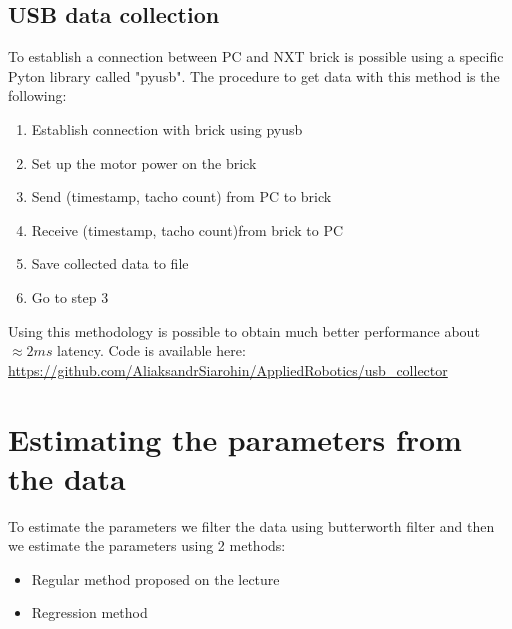 \documentclass[a4paper,12pt,oneside]{article}
\begin{document}
\subsection{USB data collection}
To establish a connection between PC and NXT brick is possible using a specific Pyton library called "pyusb".
The procedure to get data with this method is the following:
\begin{enumerate}
\item Establish connection with brick using pyusb
\item Set up the motor power on the brick
\item Send (timestamp,  tacho count) from PC to brick
\item Receive (timestamp,  tacho count)from brick to PC
\item Save collected data to file
\item Go to step 3
\end{enumerate}
Using this methodology is possible to obtain much better performance about $\approx 2ms$ latency. 
Code is available here: \url{https://github.com/AliaksandrSiarohin/AppliedRobotics/usb_collector}
\section {Estimating the parameters from the data}
To estimate the parameters we filter the data using butterworth filter and then we estimate the parameters using 2 methods:
\begin{itemize}
\item Regular method proposed on the lecture
\item Regression method
\end{itemize}
\end{document}
